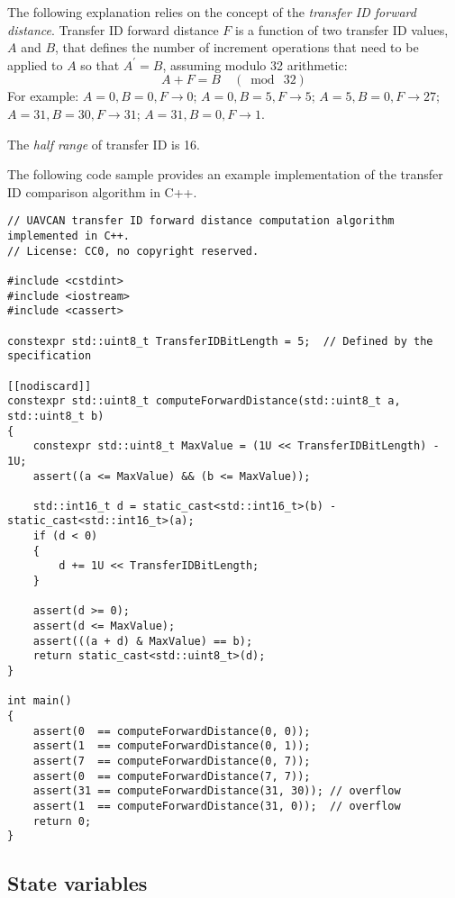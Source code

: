 The following explanation relies on the concept of the \emph{transfer ID forward distance}.
Transfer ID forward distance $F$ is a function of two transfer ID values,
$A$ and $B$, that defines the number of increment operations that need to be applied to
$A$ so that $A^\prime{} = B$, assuming modulo 32 arithmetic:
$$A + F = B \quad (\bmod{}\ 32)$$
For example:
$A=0, B=0, F\rightarrow0$;
$A=0, B=5, F\rightarrow5$;
$A=5, B=0, F\rightarrow27$;
$A=31, B=30, F\rightarrow31$;
$A=31, B=0, F\rightarrow1$.

The \emph{half range} of transfer ID is 16.

The following code sample provides an example implementation of the transfer ID comparison algorithm in C++.

\begin{minipage}{0.9\textwidth}  %
\begin{verbatim}
// UAVCAN transfer ID forward distance computation algorithm implemented in C++.
// License: CC0, no copyright reserved.

#include <cstdint>
#include <iostream>
#include <cassert>

constexpr std::uint8_t TransferIDBitLength = 5;  // Defined by the specification

[[nodiscard]]
constexpr std::uint8_t computeForwardDistance(std::uint8_t a, std::uint8_t b)
{
    constexpr std::uint8_t MaxValue = (1U << TransferIDBitLength) - 1U;
    assert((a <= MaxValue) && (b <= MaxValue));

    std::int16_t d = static_cast<std::int16_t>(b) - static_cast<std::int16_t>(a);
    if (d < 0)
    {
        d += 1U << TransferIDBitLength;
    }

    assert(d >= 0);
    assert(d <= MaxValue);
    assert(((a + d) & MaxValue) == b);
    return static_cast<std::uint8_t>(d);
}

int main()
{
    assert(0  == computeForwardDistance(0, 0));
    assert(1  == computeForwardDistance(0, 1));
    assert(7  == computeForwardDistance(0, 7));
    assert(0  == computeForwardDistance(7, 7));
    assert(31 == computeForwardDistance(31, 30)); // overflow
    assert(1  == computeForwardDistance(31, 0));  // overflow
    return 0;
}
\end{verbatim}
\end{minipage}

\subsection{State variables}

